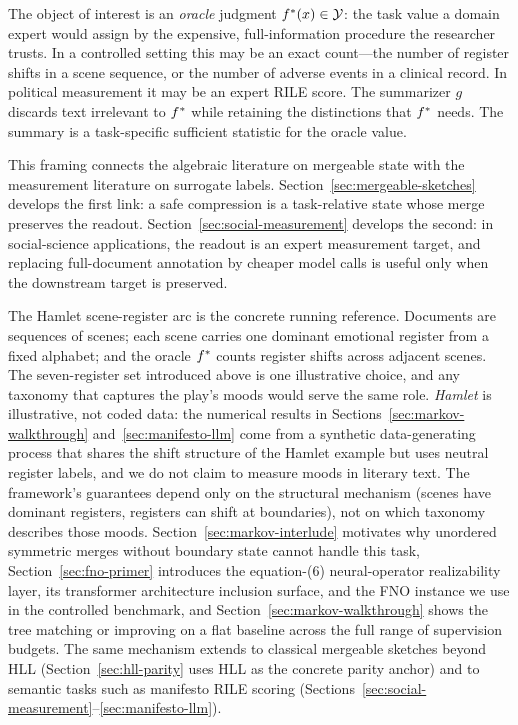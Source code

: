 The object of interest is an \emph{oracle} judgment $f^\ast(x) \in \mathcal{Y}$: the task value a domain expert would assign by the expensive, full-information procedure the researcher trusts. In a controlled setting this may be an exact count---the number of register shifts in a scene sequence, or the number of adverse events in a clinical record. In political measurement it may be an expert RILE score. The summarizer $g$ discards text irrelevant to $f^\ast$ while retaining the distinctions that $f^\ast$ needs. The summary is a task-specific sufficient statistic for the oracle value.

This framing connects the algebraic literature on mergeable state with the
measurement literature on surrogate labels. Section~\ref{sec:mergeable-sketches}
develops the first link: a safe compression is a task-relative state whose
merge preserves the readout. Section~\ref{sec:social-measurement} develops
the second: in social-science applications, the readout is an expert
measurement target, and replacing full-document annotation by cheaper model
calls is useful only when the downstream target is preserved.

The Hamlet scene-register arc is the concrete running reference. Documents are sequences of scenes; each scene carries one dominant emotional register from a fixed alphabet; and the oracle $f^\ast$ counts register shifts across adjacent scenes. The seven-register set introduced above is one illustrative choice, and any taxonomy that captures the play's moods would serve the same role. \emph{Hamlet} is illustrative, not coded data: the numerical results in Sections~\ref{sec:markov-walkthrough} and~\ref{sec:manifesto-llm} come from a synthetic data-generating process that shares the shift structure of the Hamlet example but uses neutral register labels, and we do not claim to measure moods in literary text. The framework's guarantees depend only on the structural mechanism (scenes have dominant registers, registers can shift at boundaries), not on which taxonomy describes those moods. Section~\ref{sec:markov-interlude} motivates why unordered symmetric merges without boundary state cannot handle this task, Section~\ref{sec:fno-primer} introduces the equation-(6) neural-operator realizability layer, its transformer architecture inclusion surface, and the FNO instance we use in the controlled benchmark, and Section~\ref{sec:markov-walkthrough} shows the tree matching or improving on a flat baseline across the full range of supervision budgets. The same mechanism extends to classical mergeable sketches beyond HLL (Section~\ref{sec:hll-parity} uses HLL as the concrete parity anchor) and to semantic tasks such as manifesto RILE scoring (Sections~\ref{sec:social-measurement}--\ref{sec:manifesto-llm}).

